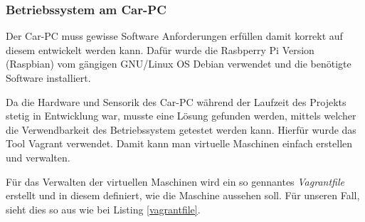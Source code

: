 \subsubsection{Betriebssystem am Car-PC}
\label{subsec:oscarpc}

Der Car-PC muss gewisse Software Anforderungen erfüllen damit korrekt auf diesem entwickelt werden kann. Dafür wurde die Rasbperry Pi Version (Raspbian) vom gängigen GNU/Linux OS Debian verwendet und die benötigte Software installiert.

Da die Hardware und Sensorik des Car-PC während der Laufzeit des Projekts stetig in Entwicklung war, musste eine Lösung gefunden werden, mittels welcher die Verwendbarkeit des Betriebssystem getestet werden kann. Hierfür wurde das Tool Vagrant \cite{MELD.CH3-vagrant.website} verwendet. Damit kann man virtuelle Maschinen einfach erstellen und verwalten. 

Für das Verwalten der virtuellen Maschinen wird ein so gennantes \textit{Vagrantfile} erstellt und in diesem definiert, wie die Maschine aussehen soll. Für unseren Fall, sieht dies so aus wie bei Listing \ref{vagrantfile}.

